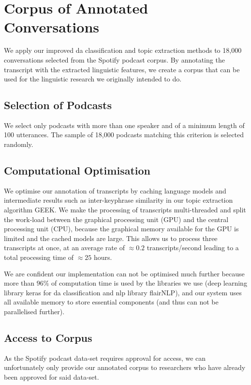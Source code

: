 {\let\clearpage\relax \chapter[Annotated Corpus]{Corpus of Annotated Conversations\label{cpt: method annotated corpus}}}

We apply our improved \gls{da} classification and topic extraction methods to 18,000 conversations selected from the Spotify podcast corpus\cite{clifton-2020100000}. By annotating the transcript with the extracted linguistic features, we create a corpus that can be used for the linguistic research we originally intended to do.

\section{Selection of Podcasts}
We select only podcasts with more than one speaker and of a minimum length of 100 \glspl{utterance}. The sample of 18,000 podcasts matching this criterion is selected randomly.

\section{Computational Optimisation}
We optimise our annotation of transcripts by caching language \glspl{model} and intermediate results such as inter-\gls{keyphrase} similarity in our topic extraction algorithm GEEK.
We make the processing of transcripts multi-threaded and split the work-load between the graphical processing unit (GPU) and the central processing unit (CPU), because the graphical memory available for the GPU is limited and the cached \glspl{model} are large. This allows us to process three transcripts at once, at an average rate of $\approx 0.2$ transcripts/second leading to a total processing time of $\approx 25$ hours.

We are confident our implementation can not be optimised much further because more than $96\%$ of computation time is used by the libraries we use (deep learning library keras\cite{chollet2015keras} for \gls{da} classification and \gls{nlp} library flairNLP\cite{flairNLP}), and our system uses all available memory to store essential components (and thus can not be parallelised further).

\section{Access to Corpus}

As the Spotify podcast data-set requires approval for access, we can unfortunately only provide our annotated corpus to researchers who have already been approved for said data-set. \newline
